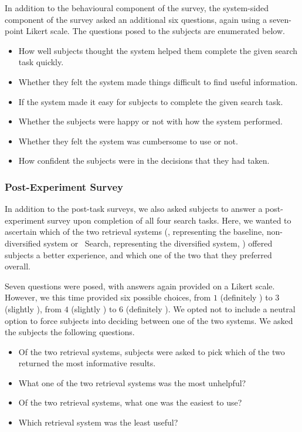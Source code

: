In addition to the behavioural component of the survey, the system-sided component of the survey asked an additional six questions, again using a seven-point Likert scale. The questions posed to the subjects are enumerated below.

\begin{itemize}
    \item{ How well subjects thought the system helped them complete the given search task quickly.}
    \item{ Whether they felt the system made things difficult to find useful information.}
    \item{ If the system made it easy for subjects to complete the given search task.}
    \item{ Whether the subjects were happy or not with how the system performed.}
    \item{ Whether they felt the system was cumbersome to use or not.}
    \item{ How confident the subjects were in the decisions that they had taken.}
\end{itemize}

\subsubsection{Post-Experiment Survey}\label{sec:diversity:users:postexp}
In addition to the post-task surveys, we also asked subjects to answer a post-experiment survey upon completion of all four search tasks. Here, we wanted to ascertain which of the two retrieval systems (\hula, representing the baseline, non-diversified system  or \yoyo~Search, representing the diversified system, ) offered subjects a better experience, and which one of the two that they preferred overall.

Seven questions were posed, with answers again provided on a Likert scale. However, we this time provided six possible choices, from $1$ (definitely \hula) to $3$ (slightly \hula), from $4$ (slightly \yoyo) to $6$ (definitely \yoyo). We opted not to include a neutral option to force subjects into deciding between one of the two systems. We asked the subjects the following questions.

\begin{itemize}
    \item{ Of the two retrieval systems, subjects were asked to pick which of the two returned the most informative results.}
    \item{ What one of the two retrieval systems was the most unhelpful?}
    \item{ Of the two retrieval systems, what one was the easiest to use?}
    \item{ Which retrieval system was the least useful?}
\end{itemize}

